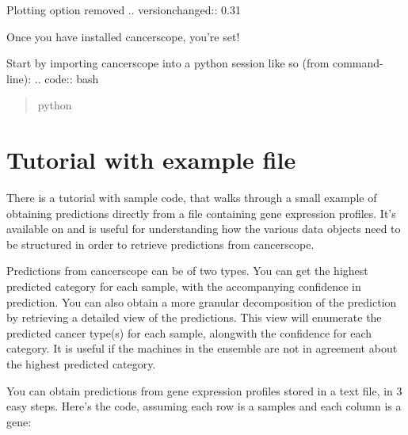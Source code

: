 \documentclass[letterpaper,10pt,english]{sphinxmanual}
\begin{document}
Plotting option removed
.. versionchanged:: 0.31

Once you have installed cancerscope, you’re set!

Start by importing cancerscope into a python session like so (from command-line):
.. code:: bash
\begin{quote}

python
\end{quote}

\begin{sphinxVerbatim}[commandchars=\\\{\}]
   
\end{sphinxVerbatim}


\chapter{Tutorial with example file}
\label{\detokenize{quickstart:tutorial-with-example-file}}\label{\detokenize{quickstart::doc}}
There is a tutorial with sample code, that walks through a small example of obtaining predictions directly from a file containing gene expression profiles. It’s available on  and is useful for understanding how the various data objects need to be structured in order to retrieve predictions from cancerscope.

Predictions from cancerscope can be of two types. You can get the highest predicted category for each sample, with the accompanying confidence in prediction. You can also obtain a more granular decomposition of the prediction by retrieving a detailed view of the predictions. This view will enumerate the predicted cancer type(s) for each sample, alongwith the confidence for each category. It is useful if the machines in the ensemble are not in agreement about the highest predicted category.

You can obtain predictions from gene expression profiles stored in a text file, in 3 easy steps. Here’s the code, assuming each row is a samples and each column is a gene:

\begin{sphinxVerbatim}[commandchars=\\\{\}]
   
  
\end{sphinxVerbatim}
\end{document}
